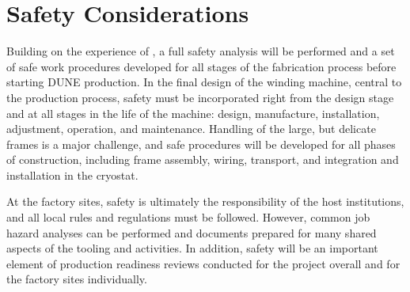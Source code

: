 \section{Safety Considerations}
\label{sec:fdsp-apa-safety}

Building on the experience of , a full safety analysis will be performed and a set of safe work procedures developed for all stages of the fabrication process before starting DUNE  production.  In the final design of the winding machine, central to the production process, safety must be incorporated right from the design stage and at all stages in the life of the machine: design, manufacture, installation, adjustment, operation, and maintenance.  Handling of the large, but delicate frames is a major challenge, and safe procedures will be developed for all phases of construction, including frame assembly, wiring, transport, and integration and installation in the cryostat.         

At the factory sites, safety is ultimately the responsibility of the host institutions, and all local rules and regulations must be followed.  However, common job hazard analyses can be performed and documents prepared for many shared aspects of the tooling and activities.  In addition, safety will be an important element of production readiness reviews conducted for the project overall and for the factory sites individually.   
